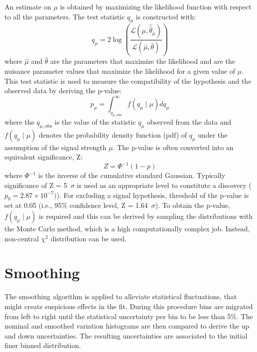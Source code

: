 An estimate on $\mu$ is obtained by maximizing the likelihood function with respect to all the parameters. The test statistic $q_{\mu}$ is constructed with:
\begin{equation}
q_{\mu}=2 \log \left(\frac{\mathcal{L}\left(\mu, \hat{\hat{\theta}}_{\mu}\right)}{\mathcal{L}(\hat{\mu}, \hat{\theta})}\right)
\end{equation}
where $\hat{\mu}$ and $\hat{\theta}$ are the parameters that maximize the likelihood and \hat{\hat{\theta}} are the nuisance parameter values that maximize the likelihood for a given value of $\mu$. 
This test statistic is used to measure the compatibility of the hypothesis and the observed data by deriving the p-value:
\begin{equation}
p_{\mu}=\int_{q_{\mu, \mathrm{obs}}}^{\infty} f\left(q_{\mu} \mid \mu\right) d q_{\mu}
\end{equation}
where the $q_{\mu, \mathrm{obs}}$ is the value of the statistic $q_{\mu}$ observed from the data and $f\left(q_{\mu} \mid \mu\right)$ denotes the probability density function (pdf) of $q_{\mu}$ under the assumption of the signal strength $\mu$.
The p-value is often converted into an equivalent significance, Z:
\begin{equation}
Z=\Phi^{-1}(1-p)
\end{equation}
where $\Phi^{-1}$ is the inverse of the cumulative standard Gaussian.
Typically significance of Z = 5~$\sigma$ is used as an appropriate level to constitute a discovery ($p_0 = 2.87 \times 10^{-7})$). For excluding a signal hypothesis, threshold of the p-value is set at 0.05 (i.e., 95$\%$ confidence level, Z = 1.64~$\sigma$).
To obtain the p-value, $f\left(q_{\mu} \mid \mu \right)$ is required and this can be derived by sampling the distributions with the Monte Carlo method, which is a high computationally complex job. Instead, non-central $\chi^2$ distribution can be used.

\section{Smoothing}
The smoothing algorithm is applied to alleviate statistical fluctuations, that might create suspicious effects in the fit.
During this procedure bins are migrated from left to right until the statistical uncertainty per bin to be less than 5$\%$. The nominal and smoothed variation histograms are then compared to derive the up and down uncertainties. The resulting uncertainties are associated to the initial finer binned distribution. 

